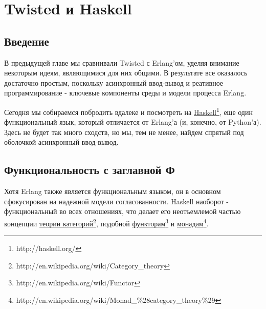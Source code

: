 
\section{Twisted и Haskell\label{sec:part21}}

\subsection{Введение}

В предыдущей главе мы сравнивали Twisted с Erlang'ом, 
уделяя внимание некоторым идеям, являющимися для них общими. 
В результате все оказалось достаточно простым, поскольку 
асинхронный ввод-вывод и реативное программирование - 
ключевые компоненты среды и модели процесса Erlang.


Сегодня мы собираемся побродить вдалеке и посмотреть на 
\href{http://haskell.org/}{Haskell}\footnote[1]{http://haskell.org/}, 
еще один функциональный язык, который отличается от Erlang'а (и, конечно, от Python'а). 
Здесь не будет так много сходств, но мы, тем не менее, найдем 
спрятый под оболочкой асинхронный ввод-вывод. 


\subsection{Функциональность с заглавной Ф}

Хотя Erlang также является функциональным языком, он в основном 
сфокусирован на надежной модели согласованности. Haskell наоборот - 
функциональный во всех отношениях, что делает его неотъемлемой 
частью концепции \href{http://en.wikipedia.org/wiki/Category\_theory}{теории категорий}\footnote[2]{http://en.wikipedia.org/wiki/Category\_theory},  
подобной \href{http://en.wikipedia.org/wiki/Functor}{функторам}\footnote[3]{http://en.wikipedia.org/wiki/Functor} 
и \href{http://en.wikipedia.org/wiki/Monad\_\%28category\_theory\%29}{монадам}\footnote[4]{http://en.wikipedia.org/wiki/Monad\_\%28category\_theory\%29}.


